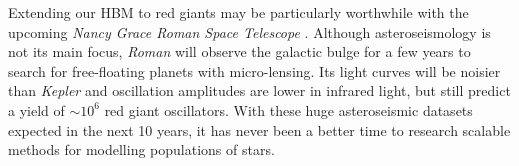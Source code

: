 

Extending our HBM to red giants may be particularly worthwhile with the upcoming \emph{Nancy Grace Roman Space Telescope} \citep[\emph{Roman}, formerly \emph{WFIRST};][]{Spergel.Gehrels.ea2015}. Although asteroseismology is not its main focus, \emph{Roman} will observe the galactic bulge for a few years to search for free-floating planets with micro-lensing. Its light curves will be noisier than \emph{Kepler} and oscillation amplitudes are lower in infrared light, but \citet{Gould.Huber.ea2015} still predict a yield of \(\sim 10^6\) red giant oscillators. With these huge asteroseismic datasets expected in the next 10 years, it has never been a better time to research scalable methods for modelling populations of stars.

